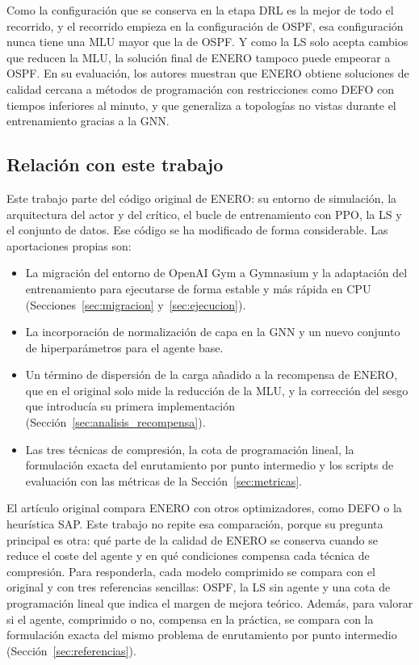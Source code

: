 Como la configuración que se conserva en la etapa DRL es la mejor de todo el recorrido, y el recorrido empieza en la configuración de OSPF, esa configuración nunca tiene una MLU mayor que la de OSPF. Y como la LS solo acepta cambios que reducen la MLU, la solución final de ENERO tampoco puede empeorar a OSPF. En su evaluación, los autores muestran que ENERO obtiene soluciones de calidad cercana a métodos de programación con restricciones como DEFO \cite{hartert2015declarative} con tiempos inferiores al minuto, y que generaliza a topologías no vistas durante el entrenamiento gracias a la GNN.

\subsection{Relación con este trabajo}

Este trabajo parte del código original de ENERO: su entorno de simulación, la arquitectura del actor y del crítico, el bucle de entrenamiento con PPO, la LS y el conjunto de datos. Ese código se ha modificado de forma considerable. Las aportaciones propias son:

\begin{itemize}
	\item La migración del entorno de OpenAI Gym a Gymnasium y la adaptación del entrenamiento para ejecutarse de forma estable y más rápida en CPU (Secciones~\ref{sec:migracion} y~\ref{sec:ejecucion}).
	\item La incorporación de normalización de capa en la GNN y un nuevo conjunto de hiperparámetros para el agente base.
	\item Un término de dispersión de la carga añadido a la recompensa de ENERO, que en el original solo mide la reducción de la MLU, y la corrección del sesgo que introducía su primera implementación (Sección~\ref{sec:analisis_recompensa}).
	\item Las tres técnicas de compresión, la cota de programación lineal, la formulación exacta del enrutamiento por punto intermedio y los scripts de evaluación con las métricas de la Sección~\ref{sec:metricas}.
\end{itemize}

El artículo original compara ENERO con otros optimizadores, como DEFO o la heurística SAP. Este trabajo no repite esa comparación, porque su pregunta principal es otra: qué parte de la calidad de ENERO se conserva cuando se reduce el coste del agente y en qué condiciones compensa cada técnica de compresión. Para responderla, cada modelo comprimido se compara con el original y con tres referencias sencillas: OSPF, la LS sin agente y una cota de programación lineal que indica el margen de mejora teórico. Además, para valorar si el agente, comprimido o no, compensa en la práctica, se compara con la formulación exacta del mismo problema de enrutamiento por punto intermedio (Sección~\ref{sec:referencias}).

